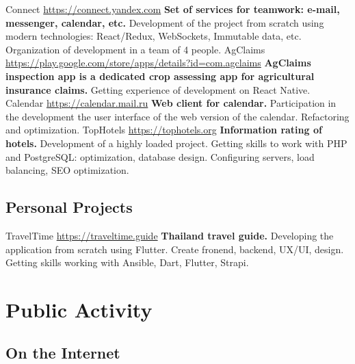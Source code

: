 \documentclass[11pt,a4paper]{moderncv}
\begin{document}
  \cvline
    {Connect}
    {\url{https://connect.yandex.com}\newline{}
    \textbf{Set of services for teamwork: e-mail, messenger, calendar, etc.}\newline{}
    Development of the project from scratch using modern technologies:
    React/Redux, WebSockets, Immutable data, etc.
    Organization of development in a team of 4 people.}
  \cvline
    {AgClaims}
    {\url{https://play.google.com/store/apps/details?id=com.agclaims}\newline{}
    \textbf{AgClaims inspection app is a dedicated crop assessing app for agricultural insurance claims.}\newline{}
    Getting experience of development on React Native.}
  \cvline
    {Calendar}
    {\url{https://calendar.mail.ru}\newline{}
    \textbf{Web client for calendar.}\newline{}
    Participation in the development the user interface of the web version of the calendar.\newline{}
    Refactoring and optimization.}
  \cvline
    {TopHotels}
    {\url{https://tophotels.org}\newline{}
    \textbf{Information rating of hotels.}\newline{}
    Development of a highly loaded project.
    Getting skills to work with PHP and PostgreSQL: optimization, database design.
    Configuring servers, load balancing, SEO optimization.}

  \subsection{Personal Projects}
  \cvline
    {TravelTime}
    {\url{https://traveltime.guide}\newline{}
    \textbf{Thailand travel guide.}\newline{}
    Developing the application from scratch using Flutter. Create fronend, backend, UX/UI, design. 
    Getting skills working with Ansible, Dart, Flutter, Strapi.}

\section{Public Activity}
  \subsection{On the Internet}
\end{document}
